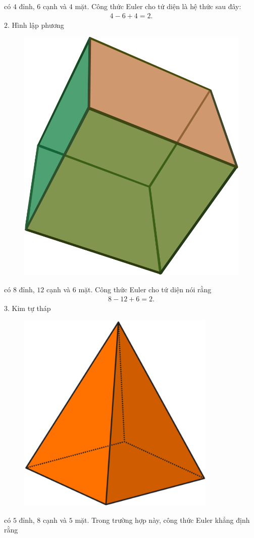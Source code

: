 \begin{multicols}{2}
{\begin{figure}[H]
		\vspace*{-10pt}
	\end{figure}
	có $4$ đỉnh, $6$ cạnh và $4$ mặt. Công thức Euler cho tứ diện là hệ thức sau đây:
	\begin{align*}
		\boxed{4-6+4=2.}
	\end{align*}
	$2.$ Hình lập phương
	\begin{figure}[H]
		\centering
		\vspace*{-5pt}
		\captionsetup{labelformat= empty, justification=centering}
		\includegraphics[width=0.45\linewidth]{Hexahedron}
		\vspace*{-10pt}
	\end{figure}
	có $8$ đỉnh, $12$ cạnh và $6$ mặt. Công thức Euler cho tứ diện nói rằng
	\begin{align*}
		\boxed{8-12+6=2.}
	\end{align*}
	$3.$ Kim  tự tháp
	\begin{figure}[H]
		\centering
		\vspace*{-5pt}
		\captionsetup{labelformat= empty, justification=centering}
		\includegraphics[width=0.45\linewidth]{Pyramid}
		\vspace*{-10pt}
	\end{figure}
	có $5$ đỉnh, $8$ cạnh và $5$ mặt. Trong trường hợp này, công thức Euler khẳng định rằng
}
\end{multicols}
